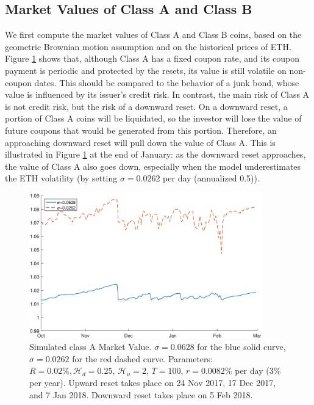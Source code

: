 \documentclass[11pt]{article}%
\numberwithin{equation}{section}
\theoremstyle{plain}
\begin{document}
\subsection{Market Values of Class A and Class B}


We first compute the market values of Class A and Class B coins, based on the geometric Brownian motion assumption and on the historical prices of ETH. Figure \ref{fig:valA} shows that, although Class A has a fixed coupon rate, and its coupon payment is periodic and protected by the resets, its value is still volatile on non-coupon dates. This should be compared to the behavior of a junk bond, whose value is influenced by its issuer's credit risk. In contrast, the main risk of Class A is not credit risk, but the risk of a downward reset. On a downward reset, a portion of Class A coins will be liquidated, so the investor will lose the value of future coupons that would be generated from this portion. Therefore, an approaching downward reset will pull down the value of Class A. This is illustrated in Figure \ref{fig:valA} at the end of January: as the downward reset approaches, the value of Class A also goes down, especially when the model underestimates the ETH volatility (by setting $\sigma=0.0262$ per day (annualized 0.5)).

\begin{figure}[!htb]
\begin{centering}
\includegraphics[width=0.9\textwidth]{WA.eps}
\par\end{centering}
\caption{Simulated class A Market Value. $\sigma = 0.0628$ for the blue solid curve, $\sigma=0.0262$ for the red dashed curve. Parameters: $R=0.02\%,\mathcal{H}_{d}=0.25$, $\mathcal{H}_{u} =2$, $T=100$, $r=0.0082\%$ per day ($3\%$ per year). Upward reset takes place on 24 Nov 2017, 17 Dec 2017, and 7 Jan 2018. Downward reset takes place on 5 Feb 2018.}\label{fig:valA}
\end{figure}
\end{document}

